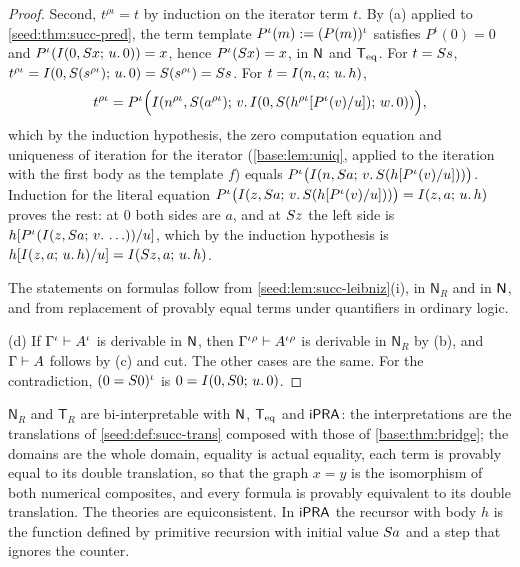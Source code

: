 \begin{proof}
Second, $t^{\rho\iota}=t$ by induction on the iterator term $t$. By (a)
applied to \cref{seed:thm:succ-pred}, the term template
$P^{\iota}(m)\mathrel{:=}(P(m))^{\iota}$ satisfies $P^{\iota}(0)=0$ and
$P^{\iota}(I(0,S x;\,u.\,0))=x$, hence $P^{\iota}(S x)=x$, in $\mathsf{N}$
and $\mathsf{T}_{\mathrm{eq}}$. For $t=S s$,
$t^{\rho\iota}=I(0,S(s^{\rho\iota});\,u.\,0)=S(s^{\rho\iota})=S s$.
For $t=I(n,a;\,u.\,h)$,
\[
 t^{\rho\iota}=P^{\iota}\Bigl(I(n^{\rho\iota},S(a^{\rho\iota});\,v.\,I(0,S(h^{\rho\iota}[P^{\iota}(v)/u]);\,w.\,0))\Bigr),
\]
which by the induction hypothesis, the zero computation equation and
uniqueness of iteration for the iterator (\cref{base:lem:uniq}, applied to
the iteration with the first body as the template $f$) equals
$P^{\iota}\bigl(I(n,S a;\,v.\,S(h[P^{\iota}(v)/u]))\bigr)$.
Induction for the literal equation
$P^{\iota}\bigl(I(z,S a;\,v.\,S(h[P^{\iota}(v)/u]))\bigr)
=I(z,a;\,u.\,h)$ proves the rest: at $0$ both sides are $a$, and at
$S z$ the left side is
$h[P^{\iota}(I(z,S a;\,v.\,\ldots))/u]$, which by the induction
hypothesis is $h[I(z,a;\,u.\,h)/u]=I(S z,a;\,u.\,h)$.

The statements on formulas follow from
\cref{seed:lem:succ-leibniz}(i), in $\mathsf{N}_R$ and in $\mathsf{N}$, and from
replacement of provably equal terms under quantifiers in ordinary logic.

(d) If $\Gamma^{\iota}\vdash A^{\iota}$ is derivable in $\mathsf{N}$, then
$\Gamma^{\iota\rho}\vdash A^{\iota\rho}$ is derivable in $\mathsf{N}_R$ by
(b), and $\Gamma\vdash A$ follows by (c) and cut. The other cases are the
same. For the contradiction, $(0=S 0)^{\iota}$ is
$0=I(0,S 0;\,u.\,0)$.
\end{proof}

\begin{corollary}\label{seed:thm:succ-bridge}
$\mathsf{N}_R$ and $\mathsf{T}_R$ are bi-interpretable with $\mathsf{N}$, $\mathsf{T}_{\mathrm{eq}}$
and $\mathsf{iPRA}$: the interpretations are the translations of
\cref{seed:def:succ-trans} composed with those of \cref{base:thm:bridge};
the domains are the whole domain, equality is actual equality, each term is
provably equal to its double translation, so that the graph $x=y$ is the
isomorphism of both numerical composites, and every formula is provably
equivalent to its double translation. The theories are equiconsistent.
In $\mathsf{iPRA}$ the recursor with body $h$ is the function defined by primitive
recursion with initial value $S a$ and a step that ignores the counter.
\end{corollary}

